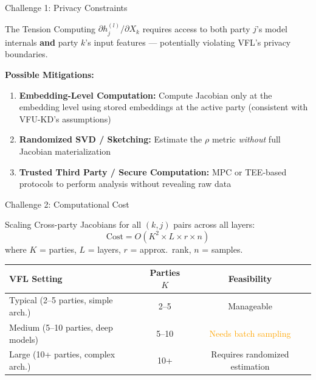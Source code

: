 \documentclass[aspectratio=169, 11pt]{beamer}
\begin{document}
\begin{frame}{Challenge 1: Privacy Constraints}
  \begin{alertblock}{The Tension}
    Computing $\partial h_j^{(l)} / \partial X_k$ requires access to both party $j$'s model internals \textbf{and} party $k$'s input features — potentially violating VFL's privacy boundaries.
  \end{alertblock}
  \vspace{0.3cm}
  \textbf{Possible Mitigations:}
  \begin{enumerate}
    \item \textbf{Embedding-Level Computation:} Compute Jacobian only at the embedding level using stored embeddings at the active party (consistent with VFU-KD's assumptions)
    \item \textbf{Randomized SVD / Sketching:} Estimate the $\rho$ metric \emph{without} full Jacobian materialization
    \item \textbf{Trusted Third Party / Secure Computation:} MPC or TEE-based protocols to perform analysis without revealing raw data
  \end{enumerate}
\end{frame}

\begin{frame}{Challenge 2: Computational Cost}
  \begin{block}{Scaling}
    Cross-party Jacobians for all $(k, j)$ pairs across all layers:
    \[
    \text{Cost} = O\!\left(K^2 \times L \times r \times n\right)
    \]
    where $K$ = parties, $L$ = layers, $r$ = approx.\ rank, $n$ = samples.
  \end{block}
  \vspace{0.2cm}
  \begin{center}
    \renewcommand{\arraystretch}{1.3}
    \begin{tabular}{>{\footnotesize}l >{\footnotesize}c >{\footnotesize}c}
      \toprule
      \textbf{VFL Setting} & \textbf{Parties $K$} & \textbf{Feasibility} \\
      \midrule
      \rowcolor{softgreen!15}
      Typical (2--5 parties, simple arch.) & 2--5 & \textcolor{softgreen}{Manageable} \\
      \rowcolor{orange!15}
      Medium (5--10 parties, deep models) & 5--10 & \textcolor{orange}{Needs batch sampling} \\
      \rowcolor{accentred!15}
      Large (10+ parties, complex arch.) & 10+ & \textcolor{accentred}{Requires randomized estimation} \\
      \bottomrule
    \end{tabular}
  \end{center}
\end{frame}
\end{document}
